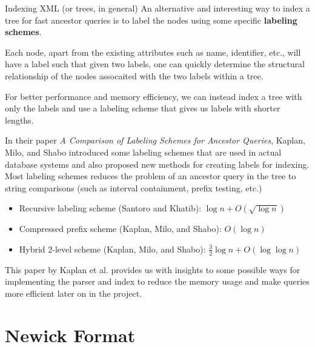 \documentclass{beamer}
\begin{document}
\begin{frame}{Indexing XML (or trees, in general)}
    An alternative and interesting way to index a tree for fast ancestor queries is to label the nodes using some specific \textbf{labeling schemes}.
    
    Each node, apart from the existing attributes such as name, identifier, etc., will have a label such that given two labels, one can quickly determine the structural relationship of the nodes assocaited with the two labels within a tree.
    
    For better performance and memory efficiency, we can instead index a tree with only the labels and use a labeling scheme that gives us labels with shorter lengths.
\end{frame}

\begin{frame}
    In their paper \textit{A Comparison of Labeling Schemes for Ancestor Queries}, Kaplan, Milo, and Shabo introduced some labeling schemes that are used in actual database systems and also proposed new methods for creating labels for indexing. Most labeling schemes reduces the problem of an ancestor query in the tree to string comparisons (such as interval containment, prefix testing, etc.)

    \begin{itemize}
        \item Recursive labeling scheme (Santoro and Khatib): $\log n + O(\sqrt{\log n})$
        \item Compressed prefix scheme (Kaplan, Milo, and Shabo): $O(\log n)$
        \item Hybrid 2-level scheme (Kaplan, Milo, and Shabo): $\frac{3}{2} \log n + O(\log \log n)$ 
    \end{itemize}

    This paper by Kaplan et al. provides us with insights to some possible ways for implementing the parser and index to reduce the memory usage and make queries more efficient later on in the project.
\end{frame}

\section{Newick Format}
\end{document}
